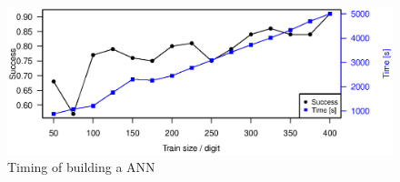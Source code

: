 \begin{figure}[h]
    \centering
    \includegraphics[width=\textwidth]{graphics/nn_timing_trainsize_200}
    \caption{Timing of building a ANN}
    \label{fig:nn_timing_trainsize}
\end{figure}
